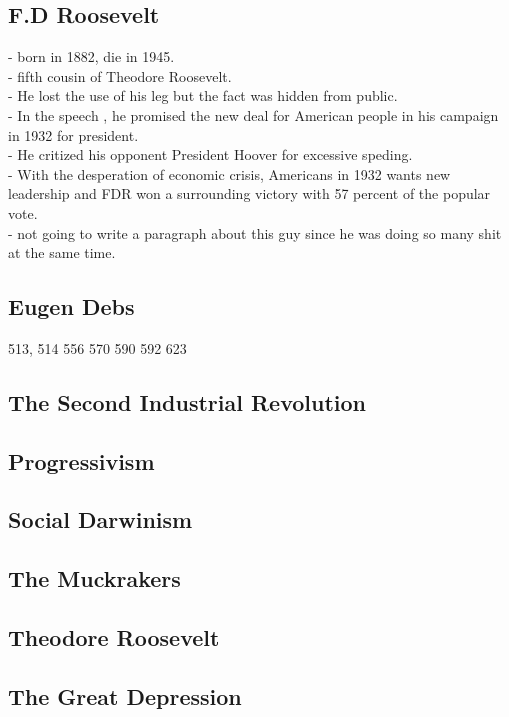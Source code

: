 \documentclass{article}
\begin{document}
\subsection{ F.D Roosevelt}
- born in 1882, die in 1945.\\
- fifth cousin of Theodore Roosevelt.\\
- He lost the use of his leg but the fact was hidden from public. \\
- In the speech , he promised the new deal for American people in his campaign in 1932 for president.\\
- He critized his opponent President Hoover for excessive speding. \\
- With the desperation of economic crisis, Americans in 1932 wants new leadership and FDR won a surrounding victory with 57 percent of the popular vote.\\
- not going to write a paragraph about this guy since he was doing so many shit at the same time.\\

\subsection{ Eugen Debs }
513, 514 556 570 590 592 623
\subsection{ The Second Industrial Revolution}

\subsection{ Progressivism}

\subsection{ Social Darwinism}

\subsection{ The Muckrakers}

\subsection{ Theodore Roosevelt}

\subsection{ The Great Depression}
\end{document}

